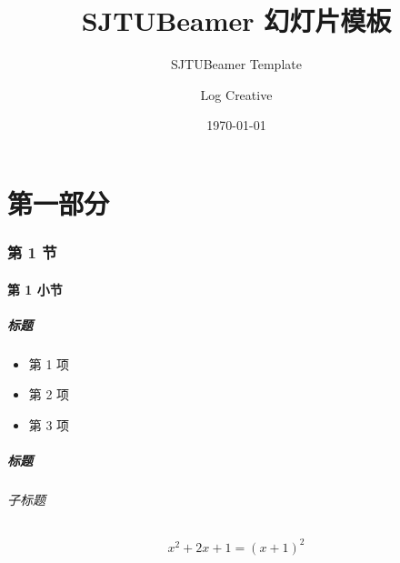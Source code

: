 \documentclass[
    aspectratio=169,                   %
]{beamer}
\institute[School of Mathematical Sciences]{数学科学学院}   %
\title{SJTUBeamer \fbox{\textsc{min}} 幻灯片模板}  %
\subtitle{SJTUBeamer \fbox{\textsc{min}} Template}         %
\author{Log Creative}                  %
\date{\today}                          %
\begin{document}
    \maketitle                         %

\part{第一部分}


\AtBeginSubsection[]{                  %
    \begin{frame}
        \subsectionpage                %
    \end{frame}
}

\section{第 1 节}
\subsection{第 1 小节}

    \begin{frame}
        \frametitle{标题}

        \begin{itemize}
            \item 第 1 项
            \item 第 2 项
            \item 第 3 项
        \end{itemize}

    \end{frame}

    \begin{frame}
        \frametitle{标题}
        \framesubtitle{子标题}

        \begin{equation}
            x^2+2x+1=(x+1)^2
        \end{equation}
        
    \end{frame}
\end{document}
